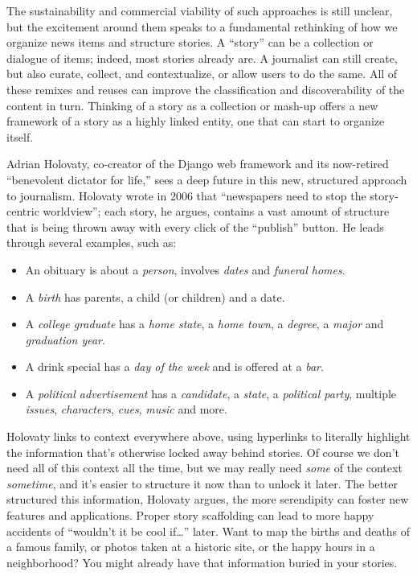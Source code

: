 The sustainability and commercial viability of such approaches is still unclear, but the excitement around them speaks to a fundamental rethinking of how we organize news items and structure stories. A ``story'' can be a collection or dialogue of items; indeed, most stories already are. A journalist can still create, but also curate, collect, and contextualize, or allow users to do the same. All of these remixes and reuses can improve the classification and discoverability of the content in turn. Thinking of a story as a collection or mash-up offers a new framework of a story as a highly linked entity, one that can start to organize itself.

Adrian Holovaty, co-creator of the Django web framework and its now-retired ``benevolent dictator for life,'' sees a deep future in this new, structured approach to journalism. Holovaty wrote in 2006 that ``newspapers need to stop the story-centric worldview''; each story, he argues, contains a vast amount of structure that is being thrown away with every click of the ``publish'' button.\autocite{holovaty_fundamental_2006} He leads through several examples, such as: \begin{itemize}
\item An obituary is about a \emph{person}, involves \emph{dates} and \emph{funeral homes}.
\item A \emph{birth} has parents, a child (or children) and a date.
\item A \emph{college graduate} has a \emph{home state}, a \emph{home town}, a \emph{degree}, a \emph{major} and \emph{graduation year}.
\item A drink special has a \emph{day of the week} and is offered at a \emph{bar}.
\item A \emph{political advertisement} has a \emph{candidate}, a \emph{state}, a \emph{political party}, multiple \emph{issues}, \emph{characters}, \emph{cues}, \emph{music} and more.\end{itemize}

\noindent Holovaty links to context everywhere above, using hyperlinks to literally highlight the information that's otherwise locked away behind stories. Of course we don't need all of this context all the time, but we may really need \emph{some} of the context \emph{sometime}, and it's easier to structure it now than to unlock it later. The better structured this information, Holovaty argues, the more serendipity can foster new features and applications. Proper story scaffolding can lead to more happy accidents of ``wouldn't it be cool if\ldots'' later. Want to map the births and deaths of a famous family, or photos taken at a historic site, or the happy hours in a neighborhood? You might already have that information buried in your stories.


